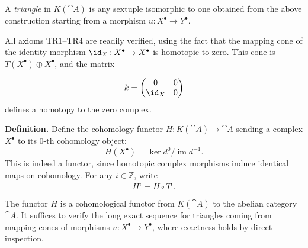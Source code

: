 A \textit{triangle} in \(K(\cat{A})\) is any sextuple isomorphic to one obtained from the above construction starting from a morphism \(u\colon X^\bullet\to Y^\bullet\).

All axioms \(\text{TR1}\)--\(\text{TR4}\) are readily verified, using the fact that the mapping cone of the identity morphism \(\id_X\colon X^\bullet\to X^\bullet\) is homotopic to zero.
This cone is \(T(X^\bullet)\oplus X^\bullet\), and the matrix

\setcounter{page}{27}
\[
k = \begin{pmatrix}
0 & 0\\
\id_X & 0
\end{pmatrix}
\]
defines a homotopy to the zero complex.

\medskip
\textbf{Definition.}
Define the cohomology functor \(H\colon K(\cat{A})\to\cat{A}\) sending a complex \(X^\bullet\) to its \(0\)-th cohomology object:
\[
H(X^\bullet) = \ker d^0 \big/ \operatorname{im} d^{-1}.
\]
This is indeed a functor, since homotopic complex morphisms induce identical maps on cohomology.
For any \(i\in\mathbb{Z}\), write
\[
H^i = H\circ T^i.
\]

The functor \(H\) is a cohomological functor from \(K(\cat{A})\) to the abelian category \(\cat{A}\). It suffices to verify the long exact sequence for triangles coming from mapping cones of morphisms \(u\colon X^\bullet\to Y^\bullet\), where exactness holds by direct inspection.